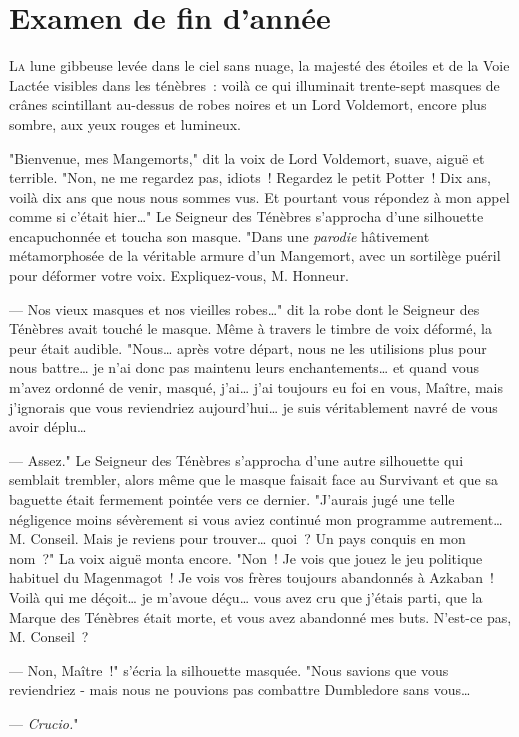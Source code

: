 \chapter{Examen de fin d’année}

\lettrine{L}{a} lune gibbeuse levée dans le ciel sans nuage, la majesté des étoiles et de la Voie Lactée visibles dans les ténèbres~: voilà ce qui illuminait trente-sept masques de crânes scintillant au-dessus de robes noires et un Lord Voldemort, encore plus sombre, aux yeux rouges et lumineux.

"Bienvenue, mes Mangemorts," dit la voix de Lord Voldemort, suave, aiguë et terrible. "Non, ne me regardez pas, idiots~! Regardez le petit Potter~! Dix ans, voilà dix ans que nous nous sommes vus. Et pourtant vous répondez à mon appel comme si c'était hier…" Le Seigneur des Ténèbres s'approcha d'une silhouette encapuchonnée et toucha son masque. "Dans une \emph{parodie} hâtivement métamorphosée de la véritable armure d'un Mangemort, avec un sortilège puéril pour déformer votre voix. Expliquez-vous, M. Honneur.

--- Nos vieux masques et nos vieilles robes…" dit la robe dont le Seigneur des Ténèbres avait touché le masque. Même à travers le timbre de voix déformé, la peur était audible. "Nous… après votre départ, nous ne les utilisions plus pour nous battre… je n'ai donc pas maintenu leurs enchantements… et quand vous m'avez ordonné de venir, masqué, j'ai… j'ai toujours eu foi en vous, Maître, mais j'ignorais que vous reviendriez aujourd'hui… je suis véritablement navré de vous avoir déplu…

--- Assez." Le Seigneur des Ténèbres s'approcha d'une autre silhouette qui semblait trembler, alors même que le masque faisait face au Survivant et que sa baguette était fermement pointée vers ce dernier. "J'aurais jugé une telle négligence moins sévèrement si vous aviez continué mon programme autrement… M. Conseil. Mais je reviens pour trouver… quoi~? Un pays conquis en mon nom~?" La voix aiguë monta encore. "Non~! Je vois que jouez le jeu politique habituel du Magenmagot~! Je vois vos frères toujours abandonnés à Azkaban~! Voilà qui me déçoit… je m'avoue déçu… vous avez cru que j'étais parti, que la Marque des Ténèbres était morte, et vous avez abandonné mes buts. N'est-ce pas, M. Conseil~?

--- Non, Maître~!" s'écria la silhouette masquée. "Nous savions que vous reviendriez - mais nous ne pouvions pas combattre Dumbledore sans vous…

--- \emph{Crucio.}"


